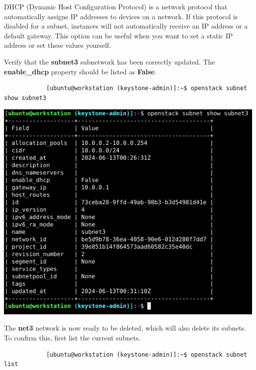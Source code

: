 \documentclass[letterpaper, 12pt]{article}
\begin{document}
\begin{enumerate}
    \begin{notebox}
        DHCP (Dynamic Host Configuration Protocol) is a network protocol that automatically assigns IP addresses to devices on a network.
        If this protocol is disabled for a subnet, instances will not automatically receive an IP address or a default gateway.
        This option can be useful when you want to set a static IP address or set these values yourself.
    \end{notebox}

    \begin{labstep}
        Verify that the \textbf{subnet3} subnetwork has been correctly updated.
        The \textbf{enable\_dhcp} property should be listed as \textbf{False}.
        \begin{lstlisting}
            [ubuntu@workstation (keystone-admin)]:~$ openstack subnet show subnet3
        \end{lstlisting}

        \begin{center}
            \includegraphics[width=\linewidth]{images/part3/step18.png}
        \end{center}
    \end{labstep}

    \begin{labstep}
        The \textbf{net3} network is now ready to be deleted, which will also delete its subnets.
        To confirm this, first list the current subnets.
        \begin{lstlisting}
            [ubuntu@workstation (keystone-admin)]:~$ openstack subnet list
        \end{lstlisting}


\end{labstep}
\end{enumerate}
\end{document}
